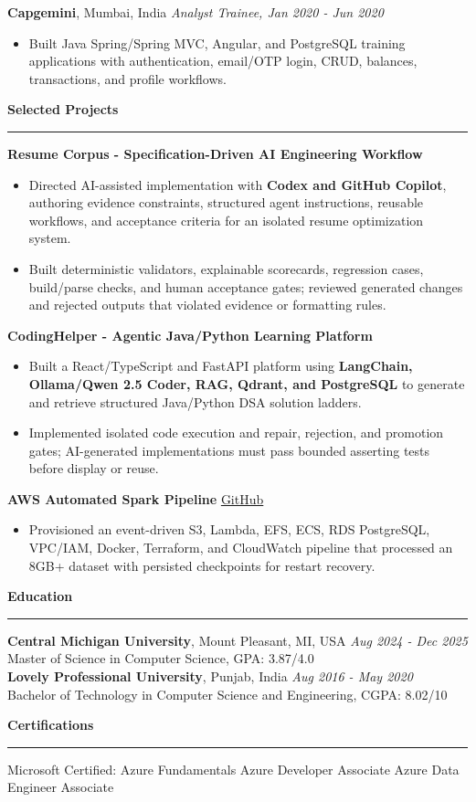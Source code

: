 \documentclass[11pt,letterpaper]{article}
\newcommand{\ressection}[1]{\Needspace{6\baselineskip}\vspace{8pt}\par\textbf{#1}\par\vspace{2pt}\hrule\vspace{5pt}}
\begin{document}
\textbf{Capgemini}, Mumbai, India \hfill \textit{Analyst Trainee, Jan 2020 - Jun 2020}
\begin{itemize}
  \item Built Java Spring/Spring MVC, Angular, and PostgreSQL training applications with authentication, email/OTP login, CRUD, balances, transactions, and profile workflows.
\end{itemize}

\ressection{Selected Projects}
\textbf{Resume Corpus - Specification-Driven AI Engineering Workflow}
\begin{itemize}
  \item Directed AI-assisted implementation with \textbf{Codex and GitHub Copilot}, authoring evidence constraints, structured agent instructions, reusable workflows, and acceptance criteria for an isolated resume optimization system.
  \item Built deterministic validators, explainable scorecards, regression cases, build/parse checks, and human acceptance gates; reviewed generated changes and rejected outputs that violated evidence or formatting rules.
\end{itemize}
\par\vspace{2pt}
\textbf{CodingHelper - Agentic Java/Python Learning Platform}
\begin{itemize}
  \item Built a React/TypeScript and FastAPI platform using \textbf{LangChain, Ollama/Qwen 2.5 Coder, RAG, Qdrant, and PostgreSQL} to generate and retrieve structured Java/Python DSA solution ladders.
  \item Implemented isolated code execution and repair, rejection, and promotion gates; AI-generated implementations must pass bounded asserting tests before display or reuse.
\end{itemize}
\par\vspace{2pt}
\textbf{AWS Automated Spark Pipeline} \hfill \href{https://github.com/preferablehuman/AWS-automated-spark-pipeline}{GitHub}
\begin{itemize}
  \item Provisioned an event-driven S3, Lambda, EFS, ECS, RDS PostgreSQL, VPC/IAM, Docker, Terraform, and CloudWatch pipeline that processed an 8GB+ dataset with persisted checkpoints for restart recovery.
\end{itemize}

\ressection{Education}
\textbf{Central Michigan University}, Mount Pleasant, MI, USA \hfill \textit{Aug 2024 - Dec 2025}\\
Master of Science in Computer Science, GPA: 3.87/4.0\\
\textbf{Lovely Professional University}, Punjab, India \hfill \textit{Aug 2016 - May 2020}\\
Bachelor of Technology in Computer Science and Engineering, CGPA: 8.02/10

\ressection{Certifications}
Microsoft Certified: Azure Fundamentals \textbar{} Azure Developer Associate \textbar{} Azure Data Engineer Associate
\end{document}
